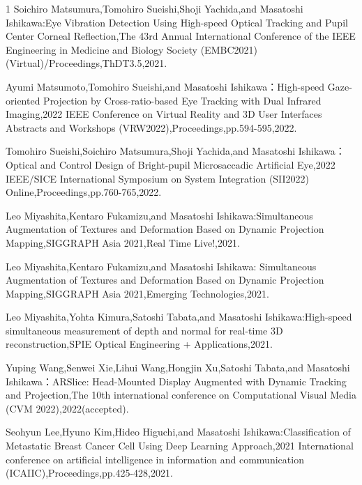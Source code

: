 \begin{査読付}{1}
Soichiro Matsumura,Tomohiro Sueishi,Shoji Yachida,and Masatoshi Ishikawa:Eye Vibration Detection Using High-speed Optical Tracking and Pupil Center Corneal Reflection,The 43rd Annual International Conference of the IEEE Engineering in Medicine and Biology Society (EMBC2021) (Virtual)/Proceedings,ThDT3.5,2021.

Ayumi Matsumoto,Tomohiro Sueishi,and Masatoshi Ishikawa：High-speed Gaze-oriented Projection by Cross-ratio-based Eye Tracking with Dual Infrared Imaging,2022 IEEE Conference on Virtual Reality and 3D User Interfaces Abstracts and Workshops (VRW2022),Proceedings,pp.594-595,2022.

Tomohiro Sueishi,Soichiro Matsumura,Shoji Yachida,and Masatoshi Ishikawa： Optical and Control Design of Bright-pupil Microsaccadic Artificial Eye,2022 IEEE/SICE International Symposium on System Integration (SII2022) Online,Proceedings,pp.760-765,2022.

Leo Miyashita,Kentaro Fukamizu,and Masatoshi Ishikawa:Simultaneous Augmentation of Textures and Deformation Based on Dynamic Projection Mapping,SIGGRAPH Asia 2021,Real Time Live!,2021.

Leo Miyashita,Kentaro Fukamizu,and Masatoshi Ishikawa: Simultaneous Augmentation of Textures and Deformation Based on Dynamic Projection Mapping,SIGGRAPH Asia 2021,Emerging Technologies,2021.

Leo Miyashita,Yohta Kimura,Satoshi Tabata,and Masatoshi Ishikawa:High-speed simultaneous measurement of depth and normal for real-time 3D reconstruction,SPIE Optical Engineering + Applications,2021.

Yuping Wang,Senwei Xie,Lihui Wang,Hongjin Xu,Satoshi Tabata,and Masatoshi Ishikawa：ARSlice: Head-Mounted Display Augmented with Dynamic Tracking and Projection,The 10th international conference on Computational Visual Media (CVM 2022),2022(accepted).

Seohyun Lee,Hyuno Kim,Hideo Higuchi,and Masatoshi Ishikawa:Classification of Metastatic Breast Cancer Cell Using Deep Learning Approach,2021 International conference on artificial intelligence in information and communication (ICAIIC),Proceedings,pp.425-428,2021.


\end{査読付}

